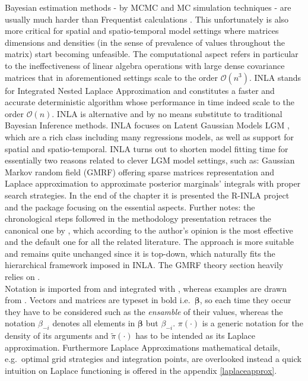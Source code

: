 \documentclass[
  12pt,
  a4paper,
  oneside]{book}
\theoremstyle{definition}
\theoremstyle{definition}
\theoremstyle{definition}
\theoremstyle{remark}
\begin{document}
Bayesian estimation methods - by MCMC \citep{mcmc} and MC simulation techniques - are usually much harder than Frequentist calculations \citep{wang2018bayesian}. This unfortunately is also more critical for spatial and spatio-temporal model settings \citep{Cameletti2012} where matrices dimensions and densities (in the sense of prevalence of values throughout the matrix) start becoming unfeasible.
The computational aspect refers in particular to the ineffectiveness of linear algebra operations with large dense covariance matrices that in aforementioned settings scale to the order \(\mathcal{O}(n^3)\).
INLA \citep{Rue2009, Rue2017} stands for Integrated Nested Laplace Approximation and constitutes a faster and accurate deterministic algorithm whose performance in time indeed scale to the order \(\mathcal{O}(n)\). INLA is alternative and by no means substitute \citep{YT:Rue} to traditional Bayesian Inference methods. INLA focuses on Latent Gaussian Models LGM \citeyearpar{wang2018bayesian}, which are a rich class including many regressions models, as well as support for spatial and spatio-temporal.
INLA turns out to shorten model fitting time for essentially two reasons related to clever LGM model settings, such as: Gaussian Markov random field (GMRF) offering sparse matrices representation and Laplace approximation to approximate posterior marginals' integrals with proper search strategies.
In the end of the chapter it is presented the R-INLA project and the package focusing on the essential aspects.
Further notes: the chronological steps followed in the methodology presentation retraces the canonical one by \citet{Rue2009}, which according to the author's opinion is the most effective and the default one for all the related literature. The approach is more suitable and remains quite unchanged since it is top-down, which naturally fits the hierarchical framework imposed in INLA. The GMRF theory section heavily relies on \citet{GMRFRue}.\\
Notation is imported from \citet{Blangiardo-Cameletti} and integrated with \citet{Bayesian_INLA_Rubio}, whereas examples are drawn from \citet{wang2018bayesian}. Vectors and matrices are typeset in bold i.e.~\(\boldsymbol{\beta}\), so each time they occur they have to be considered such as the \emph{ensamble} of their values, whereas the notation \(\beta_{-i}\) denotes all elements in \(\boldsymbol{\beta}\) but \(\beta_{-i}\).
\(\pi(\cdot)\) is a generic notation for the density of its arguments and \(\tilde\pi(\cdot)\) has to be intended as its Laplace approximation. Furthermore Laplace Approximations mathematical details, e.g.~optimal grid strategies and integration points, are overlooked instead a quick intuition on Laplace functioning is offered in the appendix \ref{laplaceapprox}.
\end{document}
